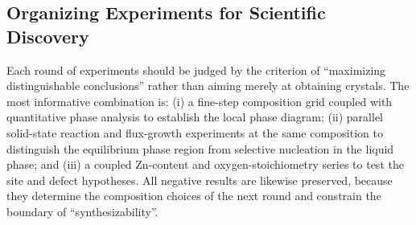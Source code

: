 \subsection{Organizing Experiments for Scientific Discovery}

Each round of experiments should be judged by the criterion of ``maximizing distinguishable conclusions'' rather than aiming merely at obtaining crystals. The most informative combination is: (i) a fine-step composition grid coupled with quantitative phase analysis to establish the local phase diagram; (ii) parallel solid-state reaction and flux-growth experiments at the same composition to distinguish the equilibrium phase region from selective nucleation in the liquid phase; and (iii) a coupled Zn-content and oxygen-stoichiometry series to test the site and defect hypotheses. All negative results are likewise preserved, because they determine the composition choices of the next round and constrain the boundary of ``synthesizability''.
